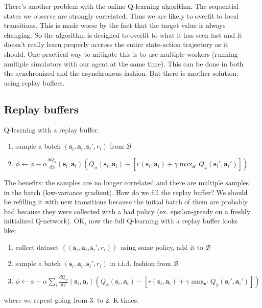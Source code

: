 \documentclass{report}
\begin{document}
There's another problem with the online Q-learning algorithm.
The sequential states we observe are strongly correlated. 
Thus we are likely to overfit to local transitions.
This is made worse by the fact that the target value is always changing.
So the algorithm is designed to overfit to what it has seen last and it doesn't really learn
properly accross the entire state-action trajectory as it should.
One practical way to mitigate this is to use multiple workers (running multiple simulators with our agent at the same time).
This can be done in both the synchronized and the asynchronous fashion.
But there is another solution: using replay buffers.

\subsection{Replay buffers}
Q-learning with a replay buffer:
\begin{enumerate}
		\item sample a batch $\left( \bm{s}_i, \bm{a}_i, \bm{s}_i', r_i \right) $ from $\mathcal{B}$
		\item $  \phi \leftarrow \phi  - \alpha \frac{d Q_\phi}{d\phi} (\bm{s}_{i}, \bm{a}_{i}) \left( Q_\phi(\bm{s}_{i}, \bm{a}_{i}) - 
			\left[ r(\bm{s}_{i}, \bm{a}_{i}) + \gamma \max_{\bm{a}'} Q_\phi (\bm{s}_{i}', \bm{a}_{i}') \right] 	\right) $ 
\end{enumerate}
The benefits: the samples are no longer correlated and there are multiple samples in the batch (low-variance gradient).
How do we fill the replay buffer?
We should be refilling it with new transitions because the initial batch of them are probably bad because they were collected with a bad policy (ex. epsilon-greedy 
on a freshly initialized Q-network).
OK, now the full Q-learning with a replay buffer looks like:
\begin{enumerate}
		\item collect dataset $\left\{ \left( \bm{s}_i, \bm{a}_i, \bm{s}_i', r_i \right)  \right\} $ using some policy, add it to $\mathcal{B}$
		\item sample a batch  $\left( \bm{s}_i, \bm{a}_i, \bm{s}_i', r_i \right)$ in i.i.d. fashion from $\mathcal{B}$
		\item $  \phi \leftarrow \phi  - \alpha \sum_{i}^{}  \frac{d Q_\phi}{d\phi} (\bm{s}_{i}, \bm{a}_{i}) \left( Q_\phi(\bm{s}_{i}, \bm{a}_{i}) - 
			\left[ r(\bm{s}_{i}, \bm{a}_{i}) + \gamma \max_{\bm{a}'} Q_\phi (\bm{s}_{i}', \bm{a}_{i}') \right] 	\right) $ 
\end{enumerate}
where we repeat going from 3. to 2. K times.
\end{document}
